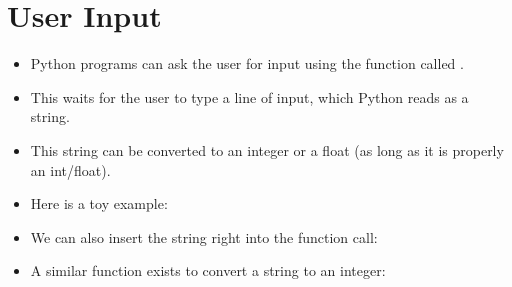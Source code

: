 \documentclass[letterpaper,10pt,english]{sphinxmanual}
\begin{document}
\section{User Input}
\label{\detokenize{lecture_notes/lec03_strings:user-input}}\begin{itemize}
\item {} 
Python programs can ask the user for input using the function called
.

\item {} 
This waits for the user to type a line of input, which Python reads
as a string.

\item {} 
This string can be converted to an integer or a float (as long as it
is properly an int/float).

\item {} 
Here is a toy example:

\begin{sphinxVerbatim}[commandchars=\\\{\}]
  
     
\end{sphinxVerbatim}

\item {} 
We can also insert the string right into the  function
call:

\begin{sphinxVerbatim}[commandchars=\\\{\}]
  
  
     
\end{sphinxVerbatim}

\item {} 
A similar function exists to convert a string to an integer:


\end{itemize}
\end{document}
